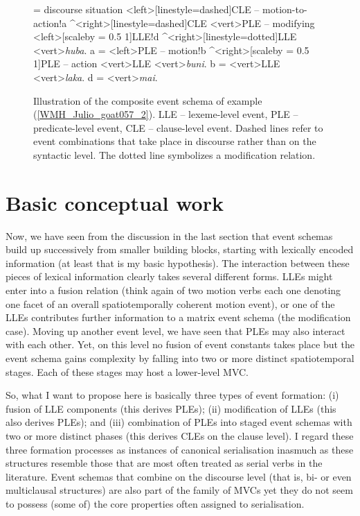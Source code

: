 \begin{figure}


\jtree[xunit=7em,yunit=2em]
\! = {discourse situation}
<left>[linestyle=dashed]{CLE -- motion-to-action}!a ^<right>[linestyle=dashed]{CLE}
<vert>{PLE -- modifying}
<left>[scaleby = 0.5 1]{LLE}!d ^<right>[linestyle=dotted]{LLE}
<vert>{\textit{huba}}.
\!a = <left>{PLE -- motion}!b ^<right>[scaleby = 0.5 1]{PLE -- action}
<vert>{LLE}
<vert>{\textit{buni}}.
\!b = <vert>{LLE}
<vert>{\textit{laka}}.
\!d = <vert>{\textit{mai}}.
\endjtree
\caption[Event schema illustration of example (\ref{WMH_Julio_goat057_2})]{Illustration of the composite event schema of example (\ref{WMH_Julio_goat057_2}). LLE -- lexeme-level event, PLE -- predicate-level event, CLE -- clause-level event. Dashed lines refer to event combinations that take place in discourse rather than on the syntactic level. The dotted line symbolizes a modification relation.}
\label{figure:eventschema}


\end{figure}


\section{Basic conceptual work} \label{sec:conceptualwork}

Now, we have seen from the discussion in the last section that event schemas build up successively from smaller building blocks, starting with lexically encoded information (at least that is my basic hypothesis). The interaction between these pieces of lexical information clearly takes several different forms. LLEs might enter into a fusion relation (think again of two motion verbs each one denoting one facet of an overall spatiotemporally coherent motion event), or one of the LLEs contributes further information to a matrix event schema (the modification case). Moving up another event level, we have seen that PLEs may also interact with each other. Yet, on this level no fusion of event constants takes place but the event schema gains complexity by falling into two or more distinct spatiotemporal stages. Each of these stages may host a lower-level MVC.

So, what I want to propose here is basically three types of event formation: (i) fusion of LLE components (this derives PLEs); (ii) modification of LLEs (this also derives PLEs); and (iii) combination of PLEs into staged event schemas with two or more distinct phases (this derives CLEs on the clause level). I regard these three formation processes as instances of canonical serialisation inasmuch as these structures resemble those that are most often treated as serial verbs in the literature. Event schemas that combine on the discourse level (that is, bi- or even multiclausal structures) are also part of the family of MVCs yet they do not seem to possess (some of) the core properties often assigned to serialisation. 


